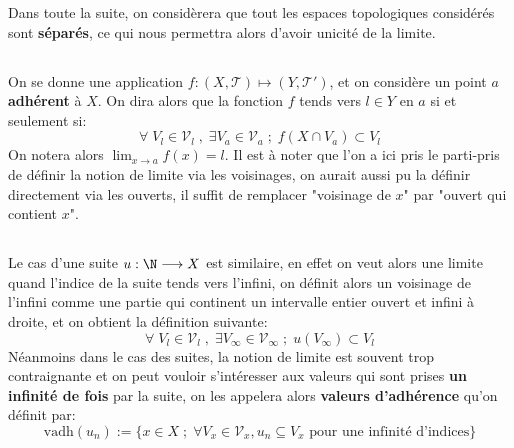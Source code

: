 Dans toute la suite, on considèrera que tout les espaces topologiques considérés sont \textbf{séparés}, ce qui nous permettra alors d'avoir unicité de la limite.

\subsection*{}
On se donne une application \(f : (X, \mathcal{T}) \longmapsto (Y, \mathcal{T}')\), et on considère un point \(a\) \textbf{adhérent} à \(X\). On dira alors que la fonction \(f\) tends vers \(l \in Y\) en \(a\) si et seulement si:
\[
   \forall \; V_l \in \mathscr{V}_l \; , \; \exists  V_a \in \mathscr{V}_a \; ; \; f(X \cap V_a) \subset V_l 
\]
On notera alors \(\lim_{x \rightarrow a} f(x) = l\). Il est à noter que l'on a ici pris le parti-pris de définir la notion de limite via les voisinages, on aurait aussi pu la définir directement via les ouverts, il suffit de remplacer "voisinage de \(x\)" par "ouvert qui contient \(x\)".
\subsection*{}
Le cas d'une suite \(u : \N \longrightarrow X\) est similaire, en effet on veut alors une limite quand l'indice de la suite tends vers l'infini, on définit alors un voisinage de l'infini comme une partie qui continent un intervalle entier ouvert et infini à droite, et on obtient la définition suivante:
\[
   \forall \; V_l \in \mathscr{V}_l \; , \; \exists  V_\infty \in \mathscr{V}_\infty \; ; \; u({V_\infty}) \subset V_l 
\]
Néanmoins dans le cas des suites, la notion de limite est souvent trop contraignante et on peut vouloir s'intéresser aux valeurs qui sont prises \textbf{un infinité de fois} par la suite, on les appelera alors \textbf{valeurs d'adhérence} qu'on définit par:
\[
   \text{vadh}(u_n) := \{ x \in X \; ; \; \forall V_x \in \mathcal{V}_x , u_n \subseteq V_x \text{ pour une infinité d'indices} \}
\]
